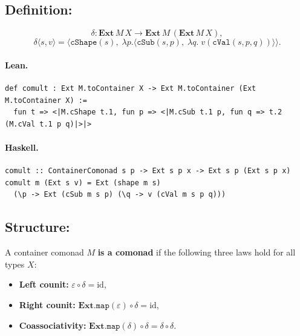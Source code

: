 \documentclass[11pt,a4paper]{article}
\begin{document}
\subsection{Definition: }

\begin{defn}[Comultiplication]
\[
  \delta : \mathbf{Ext}\,M\,X \to \mathbf{Ext}\,M\,(\mathbf{Ext}\,M\,X),
\]
\[
  \delta\langle s, v \rangle =
  \bigl\langle \mathtt{cShape}(s),\;
    \lambda p.\langle \mathtt{cSub}(s,p),\;
      \lambda q.\; v(\mathtt{cVal}(s,p,q))\rangle
  \bigr\rangle.
\]
\end{defn}

\paragraph{Lean.}
\begin{lstlisting}[style=lean]
def comult : Ext M.toContainer X -> Ext M.toContainer (Ext M.toContainer X) :=
  fun t => <|M.cShape t.1, fun p => <|M.cSub t.1 p, fun q => t.2 (M.cVal t.1 p q)|>|>
\end{lstlisting}

\paragraph{Haskell.}
\begin{lstlisting}[style=haskell]
comult :: ContainerComonad s p -> Ext s p x -> Ext s p (Ext s p x)
comult m (Ext s v) = Ext (shape m s)
  (\p -> Ext (cSub m s p) (\q -> v (cVal m s p q)))
\end{lstlisting}


\subsection{Structure: }

\begin{defn}
A container comonad $M$ \textbf{is a comonad} if the following three laws hold
for all types $X$:
\begin{itemize}
  \item \textbf{Left counit:} $\varepsilon \circ \delta = \mathrm{id}$,
  \item \textbf{Right counit:}
    $\mathbf{Ext}.\mathtt{map}(\varepsilon) \circ \delta = \mathrm{id}$,
  \item \textbf{Coassociativity:}
    $\mathbf{Ext}.\mathtt{map}(\delta) \circ \delta = \delta \circ \delta$.
\end{itemize}
\end{defn}
\end{document}
